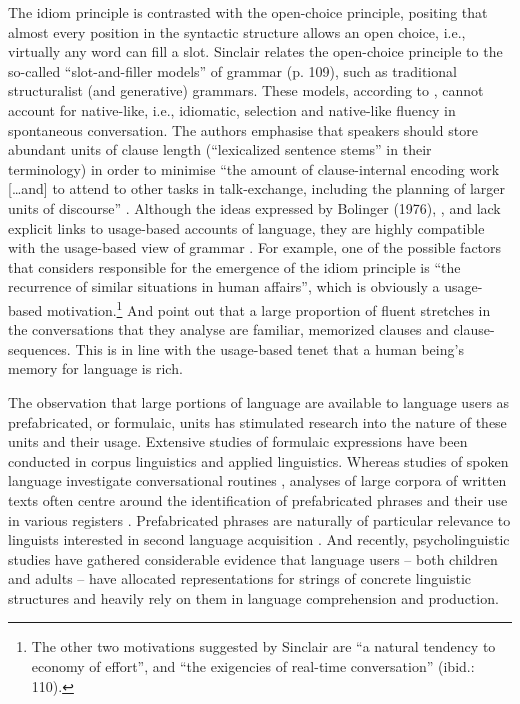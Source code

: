 \noindent The idiom principle is contrasted with the open-choice principle, positing that almost every position in the syntactic structure allows an open choice, i.e., virtually any word can fill a slot. Sinclair relates the open-choice principle to the so-called ``slot-and-filler models'' of grammar (p. 109), such as traditional structuralist (and generative) grammars. These models, according to \citet{pawley-syder-1983}, cannot account for native-like, i.e., idiomatic, selection and native-like fluency in spontaneous conversation. The authors emphasise that speakers should store abundant units of clause length (``lexicalized sentence stems'' in their terminology) in order to minimise ``the amount of clause-internal encoding work [\dots and] to attend to other tasks in talk-exchange, including the planning of larger units of discourse'' \citep[][92]{pawley-syder-1983}. Although the ideas expressed by Bolinger (1976), \citet{pawley-syder-1983}, and \citet{sinclair-1991} lack explicit links to usage-based accounts of language, they are highly compatible with the usage-based view of grammar \citep[cf.][]{five-graces}. For example, one of the possible factors that \citet[][110]{sinclair-1991} considers responsible for the emergence of the idiom principle is ``the recurrence of similar situations in human affairs'', which is obviously a usage-based motivation.\footnote{The other two motivations suggested by Sinclair are ``a natural tendency to economy of effort'', and  ``the exigencies of real-time conversation'' (ibid.: 110).} And \citet[][208]{pawley-syder-1983} point out that a large proportion of fluent stretches in the conversations that they analyse are familiar, memorized clauses and clause-sequences. This is in line with the usage-based tenet that a human being's memory for language is rich.

The observation that large portions of language are available to language users as prefabricated, or formulaic, units has stimulated research into the nature of these units and their usage. Extensive studies of formulaic expressions have been conducted in corpus linguistics and applied linguistics. Whereas studies of spoken language investigate conversational routines \citep{aijmer-1996,altenberg-1990,altenberg-1998}, analyses of large corpora of written texts often centre around the identification of prefabricated phrases \citep[e.g.,][]{erman-warren-2000,gries-2010,evert-2005} and their use in various registers \citep[e.g.,][]{biber-conrad-1999,gries-mukh-2010}. Prefabricated phrases are naturally of particular relevance to linguists interested in second language acquisition \citep[e.g.,][]{granger-1998,ellis-etal-2008,biber-etal-2004,schmitt2004}. And recently, psycholinguistic studies have gathered considerable evidence that language users -- both children and adults -- have allocated representations for strings of concrete linguistic structures and heavily rely on them in language comprehension and production. 

